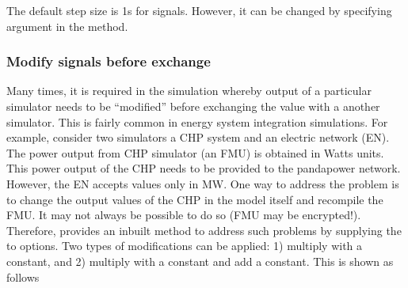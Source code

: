 \documentclass[letterpaper,10pt,english]{sphinxmanual}
\begin{document}
\begin{sphinxVerbatim}[commandchars=\\\{\}]
    
\end{sphinxVerbatim}

The default step size is 1s for signals. However, it can be changed by specifying  argument in the  method.


\subsubsection{Modify signals before exchange}
\label{\detokenize{energysim_features:modify-signals-before-exchange}}
Many times, it is required in the simulation whereby output of a particular simulator needs to be “modified” before exchanging the value with a another simulator. This is fairly common in energy system integration simulations. For example, consider two simulators a CHP system and an electric network (EN). The power output from CHP simulator (an FMU) is obtained in Watts units. This power output of the CHP needs to be provided to the pandapower network. However, the EN accepts values only in MW. One way to address the problem is to change the output values of the CHP in the model itself and recompile the FMU. It may not always be possible to do so (FMU may be encrypted!). Therefore,  provides an inbuilt method to address such problems by supplying the  to  options. Two types of modifications can be applied: 1) multiply with a constant, and 2) multiply with a constant and add a constant. This is shown as follows

\begin{sphinxVerbatim}[commandchars=\\\{\}]
  \PYG{p}{[}\PYG{p}{]} 
                 \PYG{p}{[} \PYG{p}{]} 

    
             

\end{sphinxVerbatim}
\end{document}
